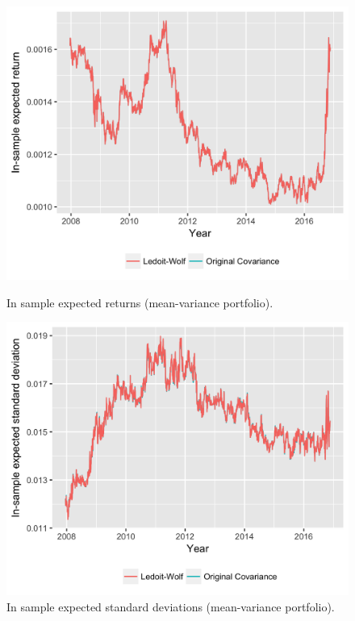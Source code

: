 \documentclass[letterpaper,12pt]{article}
\begin{document}
\begin{figure}[!tbp]
  \centering
  \begin{minipage}[t]{0.45\textwidth}
    \includegraphics[width=\textwidth]{fig_mean_variance_ins_r.png}
    \caption{In sample expected returns (mean-variance portfolio).\label{fig:fig_mean_variance_ins_r}}
  \end{minipage}
  \hfill
  \begin{minipage}[t]{0.45\textwidth}
    \includegraphics[width=\textwidth]{fig_mean_variance_ins_std.png}
    \caption{In sample expected standard deviations (mean-variance portfolio).\label{fig:fig_mean_variance_ins_std}}
  \end{minipage}
\end{figure}
\end{document}
